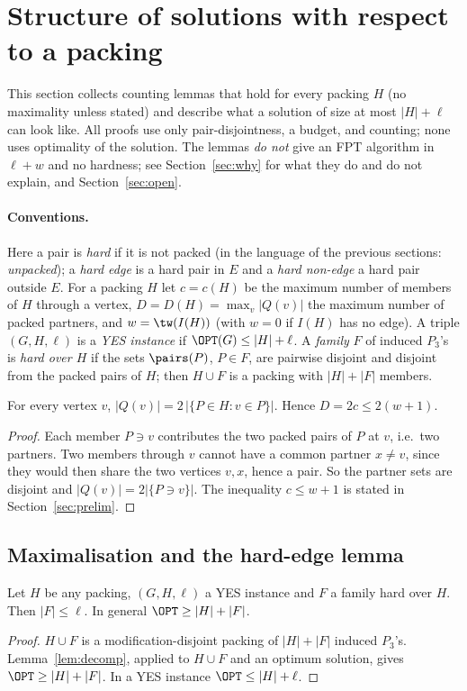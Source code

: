 \section{Structure of solutions with respect to a packing}\label{sec:packing}
This section collects counting lemmas that hold for every packing $H$ (no maximality unless stated) and describe what a solution of size at most $|H|+\ell$ can look like. All proofs use only pair-disjointness, a budget, and counting; none uses optimality of the solution. The lemmas \emph{do not} give an FPT algorithm in $\ell+w$ and no hardness; see Section~\ref{sec:why} for what they do and do not explain, and Section~\ref{sec:open}.

\paragraph{Conventions.} Here a pair is \emph{hard} if it is not packed (in the language of the previous sections: \emph{unpacked}); a \emph{hard edge} is a hard pair in $E$ and a \emph{hard non-edge} a hard pair outside $E$. For a packing $H$ let $c=c(H)$ be the maximum number of members of $H$ through a vertex, $D=D(H)=\max_v|Q(v)|$ the maximum number of packed partners, and $w=\tw(I(H))$ (with $w=0$ if $I(H)$ has no edge). A triple $(G,H,\ell)$ is a \emph{YES instance} if $\OPT(G)\le|H|+\ell$. A \emph{family} $F$ of induced $P_3$'s is \emph{hard over $H$} if the sets $\pairs(P)$, $P\in F$, are pairwise disjoint and disjoint from the packed pairs of $H$; then $H\cup F$ is a packing with $|H|+|F|$ members.

\begin{lemma}[Degrees]\label{lem:deg}
For every vertex $v$, $|Q(v)|=2\,|\{P\in H:v\in P\}|$. Hence $D=2c\le 2(w+1)$.
\end{lemma}
\begin{proof}
Each member $P\ni v$ contributes the two packed pairs of $P$ at $v$, i.e.\ two partners. Two members through $v$ cannot have a common partner $x\ne v$, since they would then share the two vertices $v,x$, hence a pair. So the partner sets are disjoint and $|Q(v)|=2|\{P\ni v\}|$. The inequality $c\le w+1$ is stated in Section~\ref{sec:prelim}.
\end{proof}

\subsection{Maximalisation and the hard-edge lemma}
\begin{lemma}\label{lem:fam}
Let $H$ be any packing, $(G,H,\ell)$ a YES instance and $F$ a family hard over $H$. Then $|F|\le\ell$. In general $\OPT\ge|H|+|F|$.
\end{lemma}
\begin{proof}
$H\cup F$ is a modification-disjoint packing of $|H|+|F|$ induced $P_3$'s. Lemma~\ref{lem:decomp}, applied to $H\cup F$ and an optimum solution, gives $\OPT\ge|H|+|F|$. In a YES instance $\OPT\le|H|+\ell$.
\end{proof}

